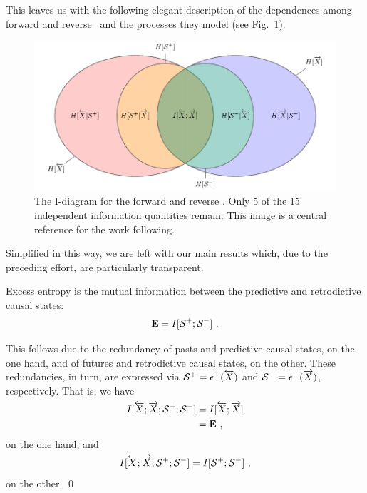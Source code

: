 This leaves us with the following elegant description of the dependences among forward and reverse \eMs\ and the processes they model (see Fig.~\ref{fig:4var_eM}).

\begin{figure}[h]
\centering
\includegraphics{../chapter2/figures/tikz/4var_eM}
\caption{The I-diagram for the forward and reverse \eMs. Only 5 of the 15 independent information quantities remain. This image is a central reference for the work following.}
\label{fig:4var_eM}
\end{figure}

Simplified in this way, we are left with our main results which, due to the
preceding effort, are particularly transparent.
\begin{The}
Excess entropy is the mutual information between the predictive and
retrodictive causal states:
\begin{equation}
{\bf E} = I[{\mathcal{S}}^{+};{\mathcal{S}}^{-}] ~.
\label{EasCausalMIEq}
\end{equation}
\label{EasCausalMI}
\end{The}

\begin{ProThe}
This follows due to the redundancy of pasts and predictive causal states, on
the one hand, and of futures and retrodictive causal states, on the other.
These redundancies, in turn, are expressed via
${\mathcal{S}}^{+} = \epsilon^{+}(\smash{\overleftarrow {{X}}})$ and
${\mathcal{S}}^{-} = \epsilon^{-}(\smash{\overrightarrow{{X}}})$, respectively. That is, we have
\begin{align}
I[\smash{\overleftarrow {{X}}};\smash{\overrightarrow{{X}}};{\mathcal{S}}^{+};{\mathcal{S}}^{-}]
	& = I[\smash{\overleftarrow {{X}}};\smash{\overrightarrow{{X}}}] \nonumber \\
	& = {\bf E} ~,
\end{align}
on the one hand, and
\begin{equation}
I[\smash{\overleftarrow {{X}}};\smash{\overrightarrow{{X}}};{\mathcal{S}}^{+};{\mathcal{S}}^{-}]
	= I[{\mathcal{S}}^{+};{\mathcal{S}}^{-}] ~,
\end{equation}
on the other.
\qed
\end{ProThe}

